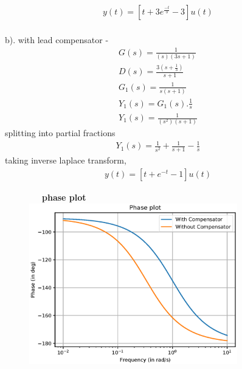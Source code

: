 \begin{enumerate}[label=\thesection.\arabic*.,ref=\thesection.\theenumi]
\begin{align}
y(t) = [t + 3e^{\frac{-t}{3}} - 3]u(t)
\end{align}
\\
b). with lead compensator - \\
\begin{align}
G(s) = \frac{1}{(s)(3s+1)}\\
D(s) = \frac{3(s+\frac{1}{3})}{s+1} \\
G_{1}(s) = \frac{1}{s(s+1)}\\
Y_{1}(s) = G_{1}(s).\frac{1}{s}\\
Y_{1}(s) = \frac{1}{(s^2)(s+1)}
\end{align}
splitting into partial fractions\\
\begin{align}
Y_{1}(s) = \frac{1}{s^2} + \frac{1}{s+1} - \frac{1}{s}
\end{align}
taking inverse laplace transform, \\
\begin{align}
y(t) = [t + e^{-t} - 1]u(t)
\end{align}


\begin{figure}
\ \ \ \textbf{phase plot}\\
\includegraphics[width=1\linewidth, height=7cm ,inner]{./figs/ee18btech11027/lead_compensator_phase.eps} 
\label{fig:subim1}
\end{figure}


\end{enumerate}
